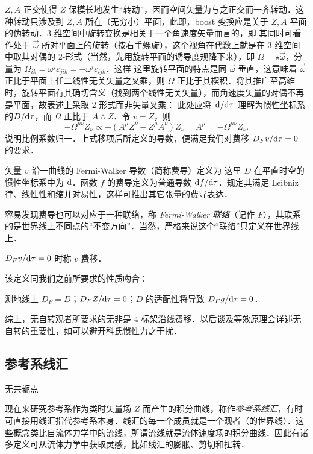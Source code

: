 $Z,A$ 正交使得 $Z$ 保模长地发生“转动”，因而空间矢量为与之正交而一齐转动．这种转动只涉及到 $Z,A$ 所在（无穷小）平面，此即，boost 变换应是关于 $Z,A$ 平面的伪转动．3 维空间中旋转变换是相关于一个角速度矢量而言的，即
其同时可看作处于 $\vec\omega$ 所对平面上的旋转（按右手螺旋），这个视角在代数上就是在 3 维空间中取其对偶的 2-形式（当然，先用旋转平面的诱导度规降下来），即 $\Omega=\star\vec\omega$，分量为 $\Omega_{ik}=\omega^j\varepsilon_{jik}=-\omega^j\varepsilon_{ijk}$．这样
这里旋转平面的特点是同 $\vec\omega$ 垂直，这意味着 $\vec\omega$ 正比于平面上任二线性无关矢量之叉乘，则 $\Omega$ 正比于其楔积．将其推广至高维时，旋转平面有其确切含义（找到两个线性无关矢量），而角速度矢量的对偶不再是平面，故表述上采取 2-形式而非矢量叉乘：
此处应将 $\dv*{\tau}$ 理解为惯性坐标系的$D/\dd\tau$，而 $\Omega$ 正比于 $A\wedge Z$．令 $v=Z$，则
\[
-\Omega^{\mu\nu} Z_\nu\propto -(A^\mu Z^\nu-Z^\mu A^\nu)Z_\nu=A^\mu=-\Omega^{\mu\nu} Z_\nu.
\]
说明比例系数归一．上式移项后所定义的导数，便满足我们对费移 $D_F v/\dd\tau=0$ 的要求．
\begin{definition}[费导]
    矢量 $v$ 沿一曲线的 Fermi-Walker 导数（简称费导）定义为
    这里 $D$ 在平直时空的惯性坐标系中为 $\dd$．函数 $f$ 的费导定义为普通导数 $\dd f/\dd\tau$．规定其满足 Leibniz 律、线性性和缩并对易性，这样可推出其它张量的费导表达．
\end{definition}
容易发现费导也可以对应于一种联络，称 \textit{Fermi-Walker 联络}（记作 $F$），其联系的是世界线上不同点的“不变方向”．当然，严格来说这个“联络”只定义在世界线上．
\begin{definition}[费移]
    $D_F v/\dd\tau=0$ 时称 $v$ 费移．
\end{definition}
该定义同我们之前所要求的性质吻合：
\begin{theorem}
    测地线上 $D_F=D$；$D_F Z/\dd\tau=0$；$D$ 的适配性将导致 $D_F g/\dd\tau=0$．
\end{theorem}
综上，无自转观者所要求的无非是 4-标架沿线费移．以后谈及等效原理会详述无自转的重要性，如可以避开科氏惯性力之干扰．

\subsection{参考系线汇}
无共轭点

现在来研究参考系作为类时矢量场 $Z$ 而产生的积分曲线，称作\textit{参考系线汇}，有时可直接用线汇指代参考系本身．线汇的每一个成员就是一个观者（的世界线）．这些概念类比自流体力学中的流线，所谓流线就是流体速度场的积分曲线．因此有诸多定义可从流体力学中获取灵感，比如线汇的膨胀、剪切和扭转．

